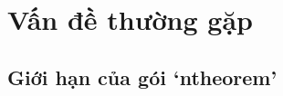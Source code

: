 \section{\texorpdfstring{Vấn đề thường gặp}{Van de thuong gap}}

\subsection{\texorpdfstring{Giới hạn của gói}{Gioi han cua goi} `ntheorem'}


